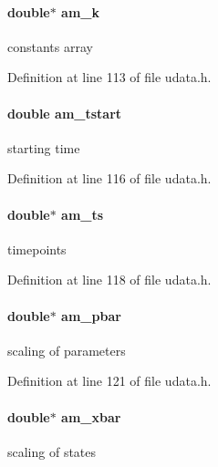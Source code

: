 \paragraph[{am\+\_\+k}]{\setlength{\rightskip}{0pt plus 5cm}double$\ast$ am\+\_\+k}\label{struct_user_data_a7b59855746129befdcfe9f3c8a4d2a4c}
constants array 

Definition at line 113 of file udata.\+h.

\hypertarget{struct_user_data_a230439d483e6fde07a6fe687219060c2}{}
\paragraph[{am\+\_\+tstart}]{\setlength{\rightskip}{0pt plus 5cm}double am\+\_\+tstart}\label{struct_user_data_a230439d483e6fde07a6fe687219060c2}
starting time 

Definition at line 116 of file udata.\+h.

\hypertarget{struct_user_data_a368434a79bdb1655bef3adc552834ddc}{}
\paragraph[{am\+\_\+ts}]{\setlength{\rightskip}{0pt plus 5cm}double$\ast$ am\+\_\+ts}\label{struct_user_data_a368434a79bdb1655bef3adc552834ddc}
timepoints 

Definition at line 118 of file udata.\+h.

\hypertarget{struct_user_data_aa73d75cc02e28bcdf108cbea53e615e9}{}
\paragraph[{am\+\_\+pbar}]{\setlength{\rightskip}{0pt plus 5cm}double$\ast$ am\+\_\+pbar}\label{struct_user_data_aa73d75cc02e28bcdf108cbea53e615e9}
scaling of parameters 

Definition at line 121 of file udata.\+h.

\hypertarget{struct_user_data_ad21f2b82715b051daf2775ed059afdbb}{}
\paragraph[{am\+\_\+xbar}]{\setlength{\rightskip}{0pt plus 5cm}double$\ast$ am\+\_\+xbar}\label{struct_user_data_ad21f2b82715b051daf2775ed059afdbb}
scaling of states 

